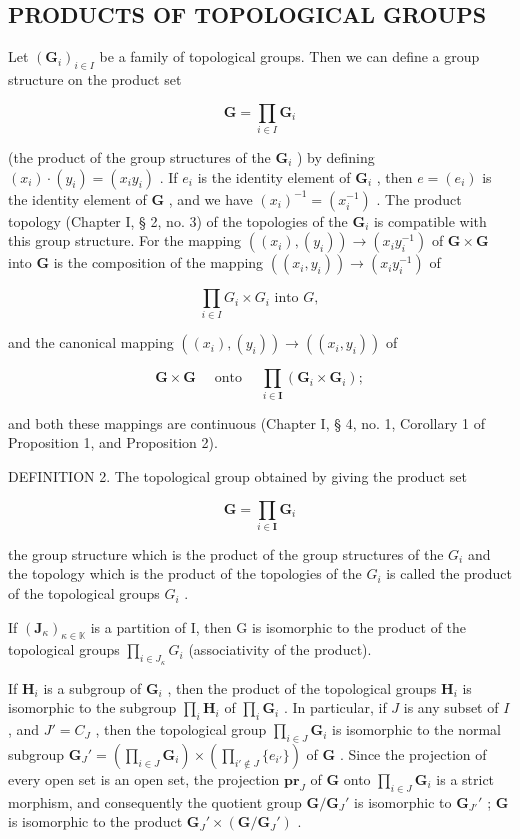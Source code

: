\subsection{PRODUCTS OF TOPOLOGICAL GROUPS}

Let \((\mathbf{G}_i)_{i\in I}\) be a family of topological groups. Then we can define a group structure on the product set

\[
\mathbf {G} = \prod_ {i \in I} \mathbf {G} _ {i}
\]

(the product of the group structures of the \(\mathbf{G}_i\) ) by defining \((x_i) \cdot (y_i) = (x_i y_i)\) . If \(e_i\) is the identity element of \(\mathbf{G}_i\) , then \(e = (e_i)\) is the identity element of \(\mathbf{G}\) , and we have \((x_i)^{-1} = (x_i^{-1})\) . The product topology (Chapter I, § 2, no. 3) of the topologies of the \(\mathbf{G}_i\) is compatible with this group structure. For the mapping \(((x_i), (y_i)) \to (x_i y_i^{-1})\) of \(\mathbf{G} \times \mathbf{G}\) into \(\mathbf{G}\) is the composition of the mapping \(((x_i, y_i)) \to (x_i y_i^{-1})\) of

\[
\prod_ {i \in I} G _ {i} \times G _ {i} \text {   into   } G,
\]

and the canonical mapping \(((x_{i}), (y_{i})) \to ((x_{i}, y_{i}))\) of

\[
\mathbf {G} \times \mathbf {G} \quad \text { onto } \quad \prod_ {i \in \mathbf {I}} (\mathbf {G} _ {i} \times \mathbf {G} _ {i});
\]

and both these mappings are continuous (Chapter I, § 4, no. 1, Corollary 1 of Proposition 1, and Proposition 2).

DEFINITION 2. The topological group obtained by giving the product set

\[
\mathbf {G} = \prod_ {i \in \mathbf {I}} \mathbf {G} _ {i}
\]

the group structure which is the product of the group structures of the \(G_{i}\) and the topology which is the product of the topologies of the \(G_{i}\) is called the product of the topological groups \(G_{i}\) .

If \((\mathbf{J}_{\kappa})_{\kappa \in \mathbb{K}}\) is a partition of I, then G is isomorphic to the product of the topological groups \(\prod_{i \in J_{\kappa}} G_{i}\) (associativity of the product).

If \(\mathbf{H}_{i}\) is a subgroup of \(\mathbf{G}_{i}\) , then the product of the topological groups \(\mathbf{H}_{i}\) is isomorphic to the subgroup \(\prod_{i} \mathbf{H}_{i}\) of \(\prod_{i} \mathbf{G}_{i}\) . In particular, if \(J\) is any subset of \(I\) , and \(J' = C_{J}\) , then the topological group \(\prod_{i \in J} \mathbf{G}_{i}\) is isomorphic to the normal subgroup \(\mathbf{G}_{J}' = (\prod_{i \in J} \mathbf{G}_{i}) \times (\prod_{i' \notin J} \{e_{i'}\})\) of \(\mathbf{G}\) . Since the projection of every open set is an open set, the projection \(\mathbf{pr}_{J}\) of \(\mathbf{G}\) onto \(\prod_{i \in J} \mathbf{G}_{i}\) is a strict morphism, and consequently the quotient group \(\mathbf{G} / \mathbf{G}_{J}'\) is isomorphic to \(\mathbf{G}_{J'}'\) ; \(\mathbf{G}\) is isomorphic to the product \(\mathbf{G}_{J}' \times (\mathbf{G} / \mathbf{G}_{J}')\) .

